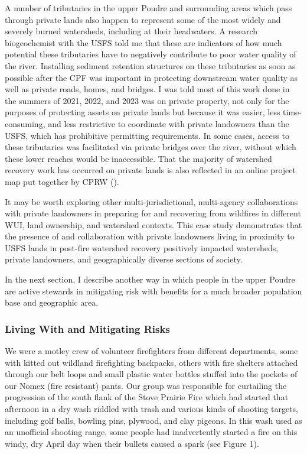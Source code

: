 \documentclass[
]{article}
\begin{document}
A number of tributaries in the upper Poudre and surrounding areas which pass through private lands also happen to represent some of the most widely and severely burned watersheds, including at their headwaters. A research biogeochemist with the USFS told me that these are indicators of how much potential these tributaries have to negatively contribute to poor water quality of the river. Installing sediment retention structures on these tributaries as soon as possible after the CPF was important in protecting downstream water quality as well as private roads, homes, and bridges. I was told most of this work done in the summers of 2021, 2022, and 2023 was on private property, not only for the purposes of protecting assets on private lands but because it was easier, less time-consuming, and less restrictive to coordinate with private landowners than the USFS, which has prohibitive permitting requirements. In some cases, access to these tributaries was facilitated via private bridges over the river, without which these lower reaches would be inaccessible. That the majority of watershed recovery work has occurred on private lands is also reflected in an online project map put together by CPRW ().

It may be worth exploring other multi-jurisdictional, multi-agency collaborations with private landowners in preparing for and recovering from wildfires in different WUI, land ownership, and watershed contexts. This case study demonstrates that the presence of and collaboration with private landowners living in proximity to USFS lands in post-fire watershed recovery positively impacted watersheds, private landowners, and geographically diverse sections of society.

In the next section, I describe another way in which people in the upper Poudre are active stewards in mitigating risk with benefits for a much broader population base and geographic area.

\subsubsection{Living With and Mitigating Risks}\label{living-with-and-mitigating-risks}

We were a motley crew of volunteer firefighters from different departments, some with kitted out wildland firefighting backpacks, others with fire shelters attached through our belt loops and small plastic water bottles stuffed into the pockets of our Nomex (fire resistant) pants. Our group was responsible for curtailing the progression of the south flank of the Stove Prairie Fire which had started that afternoon in a dry wash riddled with trash and various kinds of shooting targets, including golf balls, bowling pins, plywood, and clay pigeons. In this wash used as an unofficial shooting range, some people had inadvertently started a fire on this windy, dry April day when their bullets caused a spark (see Figure 1).
\end{document}
